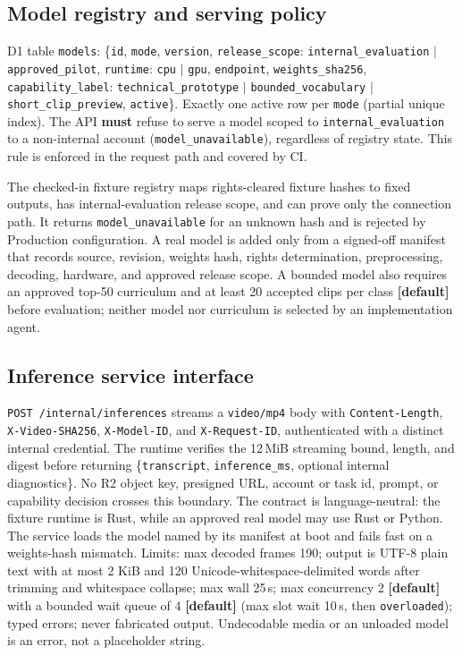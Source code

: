 \documentclass[11pt]{article}
\newcommand{\code}[1]{\texttt{#1}}
\begin{document}
\subsection{Model registry and serving policy}
\label{sec:models}

D1 table \code{models}: \{\code{id}, \code{mode}, \code{version},
\code{release\_scope}: \code{internal\_evaluation} $|$ \code{approved\_pilot},
\code{runtime}: \code{cpu} $|$ \code{gpu}, \code{endpoint}, \code{weights\_sha256},
\code{capability\_label}: \code{technical\_prototype} $|$ \code{bounded\_vocabulary}
$|$ \code{short\_clip\_preview}, \code{active}\}. Exactly one active row per
\code{mode} (partial unique index). The API \textbf{must} refuse to serve a
model scoped to \code{internal\_evaluation} to a non-internal account
(\code{model\_unavailable}), regardless of registry state. This rule is enforced
in the request path and covered by CI.

The checked-in fixture registry maps rights-cleared fixture hashes to fixed outputs,
has internal-evaluation release scope, and can prove only the connection
path. It returns \code{model\_unavailable} for an unknown hash and is rejected by
Production configuration. A real model is added only from a signed-off manifest that
records source, revision, weights hash, rights determination, preprocessing, decoding,
hardware, and approved release scope. A bounded model also requires an approved
top-50 curriculum and at least 20 accepted clips per class \textbf{[default]} before
evaluation; neither model nor curriculum is selected by an implementation agent.

\subsection{Inference service interface}

\label{sec:inferservice}
\code{POST /internal/inferences} streams a \code{video/mp4} body with
\code{Content-Length}, \code{X-Video-SHA256}, \code{X-Model-ID}, and
\code{X-Request-ID}, authenticated with a distinct internal credential. The runtime
verifies the 12\,MiB streaming bound, length, and digest before returning
\{\code{transcript}, \code{inference\_ms}, optional internal diagnostics\}. No R2
object key, presigned URL, account or task id, prompt, or capability decision crosses
this boundary. The contract is language-neutral: the
fixture runtime is Rust, while an approved real model may use Rust or Python. The
service loads the model named by its manifest at boot and fails fast on a weights-hash
mismatch. Limits: max decoded frames 190; output is UTF-8 plain text with at most
2 KiB and 120 Unicode-whitespace-delimited words after trimming and whitespace
collapse; max wall 25\,s; max concurrency 2 \textbf{[default]} with a
bounded wait queue of 4 \textbf{[default]} (max slot wait 10\,s, then
\code{overloaded}); typed errors; never fabricated output. Undecodable media or
an unloaded model is an error, not a placeholder string.
\end{document}
